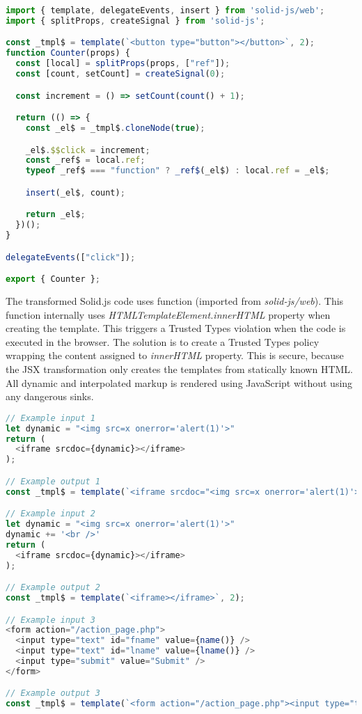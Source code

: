 \bigskip
\begin{lstlisting}[language=JavaScript, caption=Example of a Solid.js component after Babel transformation]
import { template, delegateEvents, insert } from 'solid-js/web';
import { splitProps, createSignal } from 'solid-js';

const _tmpl$ = template(`<button type="button"></button>`, 2);
function Counter(props) {
  const [local] = splitProps(props, ["ref"]);
  const [count, setCount] = createSignal(0);

  const increment = () => setCount(count() + 1);

  return (() => {
    const _el$ = _tmpl$.cloneNode(true);

    _el$.$$click = increment;
    const _ref$ = local.ref;
    typeof _ref$ === "function" ? _ref$(_el$) : local.ref = _el$;

    insert(_el$, count);

    return _el$;
  })();
}

delegateEvents(["click"]);

export { Counter };
\end{lstlisting}

The transformed Solid.js code uses  function (imported from \emph{solid-js/web}).
This function internally uses \emph{HTMLTemplateElement.innerHTML} property when creating the
template. This triggers a Trusted Types violation when the code is executed in the browser. The
solution is to create a Trusted Types policy wrapping the content assigned to \emph{innerHTML}
property. This is secure, because the JSX transformation only creates the templates from statically
known HTML. All dynamic and interpolated markup is rendered using JavaScript without using any
dangerous sinks.

\bigskip
\begin{lstlisting}[language=JavaScript, caption=Examples of JSX transformations]
// Example input 1
let dynamic = "<img src=x onerror='alert(1)'>"
return (
  <iframe srcdoc={dynamic}></iframe>
);

// Example output 1
const _tmpl$ = template(`<iframe srcdoc="<img src=x onerror='alert(1)'>"></iframe>`, 3);

// Example input 2
let dynamic = "<img src=x onerror='alert(1)'>"
dynamic += '<br />'
return (
  <iframe srcdoc={dynamic}></iframe>
);

// Example output 2
const _tmpl$ = template(`<iframe></iframe>`, 2);

// Example input 3
<form action="/action_page.php">
  <input type="text" id="fname" value={name()} />
  <input type="text" id="lname" value={lname()} />
  <input type="submit" value="Submit" />
</form>

// Example output 3
const _tmpl$ = template(`<form action="/action_page.php"><input type="text" id="fname"><input type="text" id="lname"><input type="submit" value="Submit"></form>`, 5);
\end{lstlisting}

